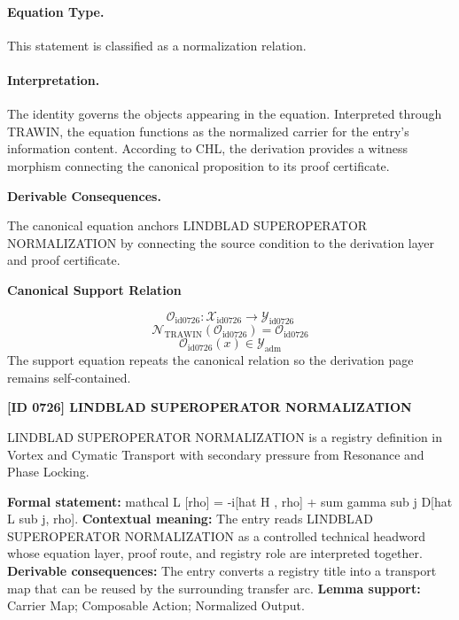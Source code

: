 \paragraph{Equation Type.}
This statement is classified as a normalization relation.

\paragraph{Interpretation.}
The identity governs the objects appearing in the equation. Interpreted through TRAWIN, the equation functions as the normalized carrier for the entry’s information content. According to CHL, the derivation provides a witness morphism connecting the canonical proposition to its proof certificate.

\par\vspace{0.35em}
\noindent\textbf{Derivable Consequences.}\quad
\begingroup
\footnotesize
\raggedright
The canonical equation anchors LINDBLAD SUPEROPERATOR NORMALIZATION by connecting the source condition to the derivation layer and proof certificate.
\par\endgroup

\noindent\textbf{Canonical Support Relation}\par
\[
\mathcal{O}_{\mathrm{id0726}}:\mathcal{X}_{\mathrm{id0726}}\longrightarrow\mathcal{Y}_{\mathrm{id0726}}
\]
\[
\mathcal{N}_{\mathrm{TRAWIN}}(\mathcal{O}_{\mathrm{id0726}})=\mathcal{O}_{\mathrm{id0726}}
\]
\[
\mathcal{O}_{\mathrm{id0726}}(x)\in\mathcal{Y}_{\mathrm{adm}}
\]
\noindent The support equation repeats the canonical relation so the derivation page remains self-contained.\par

\clearpage
\noindent\textbf{[ID 0726] LINDBLAD SUPEROPERATOR NORMALIZATION}\par
\vspace{0.35em}
\begingroup\small
{}
LINDBLAD SUPEROPERATOR NORMALIZATION is a registry definition in Vortex and Cymatic Transport with secondary pressure from Resonance and Phase Locking.

\begingroup\footnotesize\setlength{\emergencystretch}{3em}\sloppy
\textbf{Formal statement:} mathcal L [rho] = -i[hat H , rho] + sum gamma sub j D[hat L sub j, rho]. \textbf{Contextual meaning:} The entry reads LINDBLAD SUPEROPERATOR NORMALIZATION as a controlled technical headword whose equation layer, proof route, and registry role are interpreted together. \textbf{Derivable consequences:} The entry converts a registry title into a transport map that can be reused by the surrounding transfer arc. \textbf{Lemma support:} Carrier Map; Composable Action; Normalized Output.\par
\endgroup

